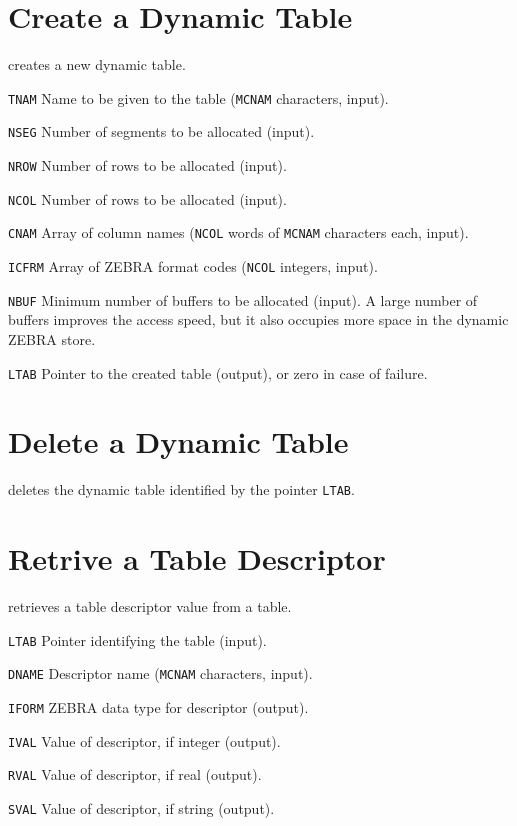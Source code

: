 \section{Create a Dynamic Table}
\label{TBCREA}
creates a new dynamic table.
\begin{mylist}
\item[\tt TNAM]
Name to be given to the table ({\tt MCNAM} characters, input).
\item[\tt NSEG]
Number of segments to be allocated (input).
\item[\tt NROW]
Number of rows to be allocated (input).
\item[\tt NCOL]
Number of rows to be allocated (input).
\item[\tt CNAM]
Array of column names ({\tt NCOL} words of {\tt MCNAM} characters
each, input).
\item[\tt ICFRM]
Array of ZEBRA format codes ({\tt NCOL} integers, input).
\item[\tt NBUF]
Minimum number of buffers to be allocated (input).
A large number of buffers improves the access speed,
but it also occupies more space in the dynamic ZEBRA store.
\item[\tt LTAB]
Pointer to the created table (output), or zero in case of failure.
\end{mylist}

\section{Delete a Dynamic Table}
\label{TBDROP}
deletes the dynamic table identified by the pointer {\tt LTAB}.

\section{Retrive a Table Descriptor}
\label{TBGDSC}
retrieves a table descriptor value from a table.
\begin{mylist}
\item[\tt LTAB]
Pointer identifying the table (input).
\item[\tt DNAME]
Descriptor name ({\tt MCNAM} characters, input).
\item[\tt IFORM]
ZEBRA data type for descriptor (output).
\item[\tt IVAL]
Value of descriptor, if integer (output).
\item[\tt RVAL]
Value of descriptor, if real (output).
\item[\tt SVAL]
Value of descriptor, if string (output).
\end{mylist}

